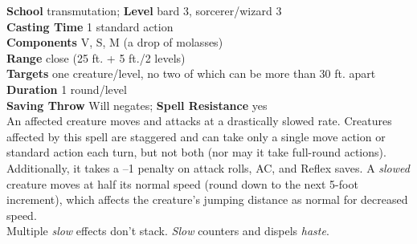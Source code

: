 \textbf{School} transmutation; \textbf{Level} bard 3, sorcerer/wizard 3\\
\textbf{Casting Time} 1 standard action\\
\textbf{Components} V, S, M (a drop of molasses)\\
\textbf{Range} close (25 ft. + 5 ft./2 levels)\\
\textbf{Targets} one creature/level, no two of which can be more than 30 ft. apart\\
\textbf{Duration} 1 round/level\\
\textbf{Saving Throw }Will negates; \textbf{Spell Resistance} yes\\
An affected creature moves and attacks at a drastically slowed rate. Creatures affected by this spell are staggered and can take only a single move action or standard action each turn, but not both (nor may it take full-round actions). Additionally, it takes a –1 penalty on attack rolls, AC, and Reflex saves. A \textit{slowed }creature moves at half its normal speed (round down to the next 5-foot increment), which affects the creature's jumping distance as normal for decreased speed.\\
Multiple \textit{slow }effects don't stack. \textit{Slow }counters and dispels \textit{haste}.\\
